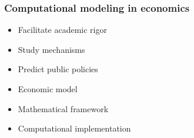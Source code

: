 \begin{frame}\frametitle{Computational modeling in economics}

	\begin{multicols}{2}
	\vspace{0.3cm}
	\begin{itemize}\setlength\itemsep{1em}
	\item Facilitate academic rigor
	\item Study mechanisms
	\item Predict public policies
	\end{itemize}

	\pause

  \vspace{0.3cm}
	\begin{itemize}\setlength\itemsep{1em}
	\item Economic model
	\item Mathematical framework
	\item Computational implementation
	\end{itemize}
	\end{multicols}

\end{frame}

